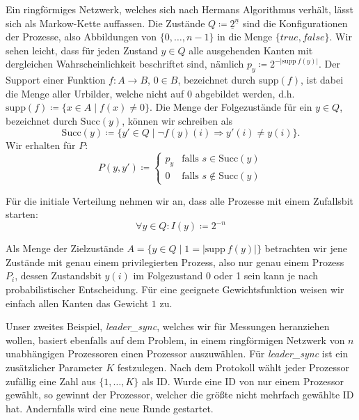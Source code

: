 \documentclass[a4paper]{article}
\newcommand{\mc}{Markow-Kette}
\theoremstyle{nonumberplain}
\begin{document}
	
	Ein ringförmiges Netzwerk, welches sich nach Hermans Algorithmus verhält, lässt sich als \mc{} \mcex{} auffassen. Die Zustände $Q \coloneqq \underline{2}^{\underline{n}}$ sind die Konfigurationen der Prozesse, also Abbildungen von $\{0, \dots , n-1\}$ in die Menge $\{true, false\}$. Wir sehen leicht, dass für jeden Zustand $y \in Q$ alle ausgehenden Kanten mit dergleichen Wahrscheinlichkeit beschriftet sind, nämlich $p_y \coloneqq 2^{-|\mathrm{supp}\>f(y)|}$. Der Support einer Funktion $f : A \to B$, $0\in B$, bezeichnet durch $\mathrm{supp}(f)$, ist dabei die Menge aller Urbilder, welche nicht auf $0$ abgebildet werden, d.h. $\mathrm{supp}(f)\coloneqq\{x \in A \mid f(x) \neq 0\}$. Die Menge der Folgezustände für ein $y \in Q$, bezeichnet durch $\mathrm{Succ}(y)$, können wir schreiben als
	\[
	\mathrm{Succ}(y) \coloneqq \{ y' \in Q \mid \neg f(y)(i) \Rightarrow y'(i) \neq y(i) \}\text{.}
	\]
	Wir erhalten für $P$:
	\begin{equation}
	P(y,y') \coloneqq \begin{cases}
	p_y & \text{falls } s\in \mathrm{Succ}(y)\\
	0 & \text{falls } s\notin \mathrm{Succ}(y)
	\end{cases}
	\end{equation}
	
	Für die initiale Verteilung nehmen wir an, dass alle Prozesse mit einem Zufallsbit starten:
	\begin{equation*}
	\forall y \in Q : I(y) \coloneqq 2^{-n}
	\end{equation*}
	
	Als Menge der Zielzustände  $A = \{ y \in Q \mid 1 = |\mathrm{supp}\>f(y)|\}$ betrachten wir jene Zustände mit genau einem privilegierten Prozess, also nur genau einem Prozess $P_i$, dessen Zustandsbit $y(i)$ im Folgezustand 0 oder 1 sein kann je nach probabilistischer Entscheidung. Für eine geeignete Gewichtsfunktion weisen wir einfach allen Kanten das Gewicht $1$ zu.
	
	\bigskip
	Unser zweites Beispiel, \textit{leader\_sync}, welches wir für Messungen heranziehen wollen, basiert ebenfalls auf dem Problem, in einem ringförmigen Netzwerk von $n$ unabhängigen Prozessoren einen Prozessor auszuwählen. Für \textit{leader\_sync} ist ein zusätzlicher Parameter $K$ festzulegen. Nach dem Protokoll wählt jeder Prozessor zufällig eine Zahl aus $\{1, \dots , K\}$ als ID. Wurde eine ID von nur einem Prozessor gewählt, so gewinnt der Prozessor, welcher die größte nicht mehrfach gewählte ID hat. Andernfalls wird eine neue Runde gestartet.
	
\end{document}
